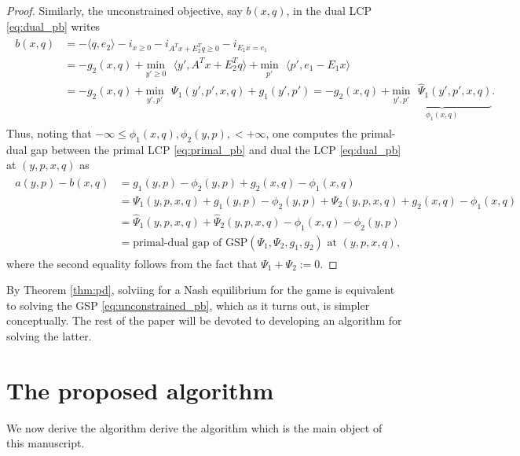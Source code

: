 \documentclass{article} %
\begin{document}
\begin{proof}
Similarly, the unconstrained objective, say
$b(x, q)$, in the dual LCP \eqref{eq:dual_pb} writes
\begin{eqnarray*}
  \begin{aligned}
 b(x, q) &= 
-\langle q, e_2\rangle -i_{x \ge 0} - i_{A^Tx+E_2^Tq \ge 0} -
 i_{E_1x = e_1}\\
 &= -g_2(x, q) + \underset{y' \geq
   0}{\text{min}}\text{ }\langle y', A^Tx + E_2^Tq\rangle +
 \underset{p'}{\text{min}}\text{ }\langle p', e_1-E_1x\rangle\\
    &= -g_2(x, q)
 +\underset{y',p'}{\text{min}}\text{ }\Psi_1(y', p', x, q) +
 g_1(y', p') = -g_2(x, q)
 +\underbrace{\underset{y',p'}{\text{min}}\text{ }\hat{\Psi}_1(y', p',
   x, q)}_{\phi_1(x, q)}.
   \end{aligned}
\end{eqnarray*}
Thus, noting that $-\infty \le \phi_1(x, q), \phi_2(y, p), < +\infty$,
one computes the primal-dual gap between the primal LCP
\eqref{eq:primal_pb} and dual the LCP \eqref{eq:dual_pb} at $(y, p, x, q)$ as
\begin{eqnarray*}
  \begin{split}
  a(y, p) - b(x, q) &= g_1(y, p) - \phi_2(y, p) + g_2(x, q) - \phi_1(x,
  q) \\
  &= \Psi_1(y, p, x, q) +  g_1(y, p) - \phi_2(y, p) + \Psi_2(y, p, x,
  q) + g_2(x, q) - \phi_1(x, q)\\
  &= \hat{\Psi}_1(y, p, x, q) + \hat{\Psi}_2(y, p, x, q) - \phi_1(x,
  q) - \phi_2(y, p)\\
  &= \text{primal-dual gap of GSP}(\Psi_1, \Psi_2,
  g_1, g_2) \text{ at }(y, p, x, q),
  \end{split}
\end{eqnarray*}
where the second equality follows from the fact that $\Psi_1 + \Psi_2
:= 0$.
\end{proof}


By Theorem \ref{thm:pd}, solviing for a Nash equilibrium for
the game is equivalent to solving the GSP
\eqref{eq:unconstrained_pb}, which as it turns out, is simpler
conceptually. The rest of the paper will be devoted to
developing an algorithm for solving the latter.



\section{The proposed algorithm}
\label{sec:algo}
We now derive the algorithm derive the algorithm which is the main object of
this manuscript.
\end{document}
